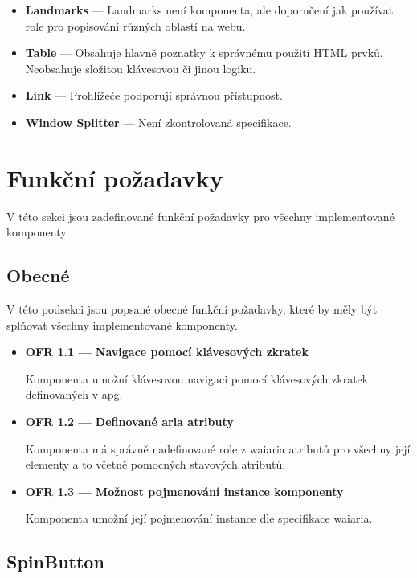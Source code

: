 \begin{itemize}
    \item \textbf{Landmarks} --- Landmarks není komponenta, ale doporučení jak používat role pro popisování různých oblastí na webu.
    \item \textbf{Table} --- Obsahuje hlavně poznatky k správnému použití HTML prvků. Neobsahuje složitou klávesovou či jinou logiku.
    \item \textbf{Link} --- Prohlížeče podporují správnou přístupnost.
    \item \textbf{Window Splitter} --- Není zkontrolovaná specifikace.
\end{itemize}

\section{Funkční požadavky}

V této sekci jsou zadefinované funkční požadavky pro všechny implementované komponenty.

\subsection{Obecné}

V této podsekci jsou popsané obecné funkční požadavky, které by měly být splňovat všechny implementované komponenty.

\begin{itemize}
    \item \textbf{OFR 1.1 --- Navigace pomocí klávesových zkratek}\label{ofr11}

          Komponenta umožní klávesovou navigaci pomocí klávesových zkratek definovaných v \gls{apg}.

    \item \textbf{OFR 1.2 --- Definované aria atributy}\label{ofr12}

          Komponenta má správně nadefinované role z \gls{waiaria} atributů pro všechny její elementy a to včetně pomocných stavových atributů.

    \item \textbf{OFR 1.3 --- Možnost pojmenování instance komponenty}\label{ofr13}

          Komponenta umožní její pojmenování instance dle specifikace \gls{waiaria}.
\end{itemize}


\subsection{SpinButton}

